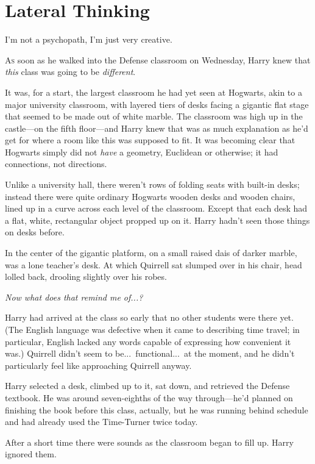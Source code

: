 \chapter{Lateral Thinking}

\epigraph{I’m not a psychopath, I’m just very creative.}{}

\lettrine{A}{s} soon as he walked into the Defense classroom on Wednesday, Harry knew that \emph{this} class was going to be \emph{different}.

It was, for a start, the largest classroom he had yet seen at Hogwarts, akin to a major university classroom, with layered tiers of desks facing a gigantic flat stage that seemed to be made out of white marble. The classroom was high up in the castle—on the fifth floor—and Harry knew that was as much explanation as he’d get for where a room like this was supposed to fit. It was becoming clear that Hogwarts simply did not \emph{have} a geometry, Euclidean or otherwise; it had connections, not directions.

Unlike a university hall, there weren’t rows of folding seats with built-in desks; instead there were quite ordinary Hogwarts wooden desks and wooden chairs, lined up in a curve across each level of the classroom. Except that each desk had a flat, white, rectangular object propped up on it. Harry hadn’t seen those things on desks before.

In the center of the gigantic platform, on a small raised dais of darker marble, was a lone teacher’s desk. At which Quirrell sat slumped over in his chair, head lolled back, drooling slightly over his robes.

\emph{Now what does that remind me of...?}

Harry had arrived at the class so early that no other students were there yet. (The English language was defective when it came to describing time travel; in particular, English lacked any words capable of expressing how convenient it was.) Quirrell didn’t seem to be...\ functional...\ at the moment, and he didn’t particularly feel like approaching Quirrell anyway.

Harry selected a desk, climbed up to it, sat down, and retrieved the Defense textbook. He was around seven-eighths of the way through—he’d planned on finishing the book before this class, actually, but he was running behind schedule and had already used the Time-Turner twice today.

After a short time there were sounds as the classroom began to fill up. Harry ignored them.

